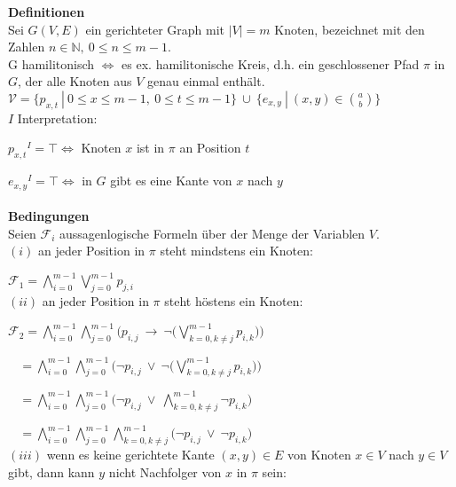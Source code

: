 \documentclass[11pt,a4paper,onecolumn,oneside]{scrartcl}
\begin{document}
\textbf{Definitionen} \\

Sei $G(V,E)$ ein gerichteter Graph mit $|V| = m$ Knoten, bezeichnet mit den Zahlen $n \in \mathbb{N},~0 \leq n \leq m-1$. \\


G hamilitonisch $\Leftrightarrow$ es ex. hamilitonische Kreis, d.h. ein geschlossener Pfad $\pi$ in $G$, der alle Knoten aus $V$ genau einmal enthält. \\

$\mathcal{V} = \{p_{x,t}~|~0 \leq x \leq m-1,~0 \leq t \leq m-1\}~\cup~\{e_{x,y}~|~(x,y) \in \binom{a}{b}\}$ \\

$I$ Interpretation:

${p_{x,t}}^I = \top \Leftrightarrow$ Knoten $x$ ist in $\pi$ an Position $t$

${e_{x,y}}^I = \top \Leftrightarrow$ in $G$ gibt es eine Kante von $x$ nach $y$ \\
\\

\textbf{Bedingungen} \\

Seien $\mathcal{F}_i$ aussagenlogische Formeln über der Menge der Variablen $V$.\\

$(i)$ an jeder Position in $\pi$ steht mindstens ein Knoten:

$\displaystyle\mathcal{F}_1 = \bigwedge_{i=0}^{m-1} \bigvee_{j=0}^{m-1} p_{j,i}$\\

$(ii)$ an jeder Position in $\pi$ steht höstens ein Knoten:

$\displaystyle\mathcal{F}_2 = \bigwedge_{i=0}^{m-1} \bigwedge_{j=0}^{m-1} \bigg(p_{i,j}~\to~\neg\Big(\bigvee_{k=0, k \ne j}^{m-1} p_{i,k}\Big)\bigg)$

$\displaystyle~~~~= \bigwedge_{i=0}^{m-1} \bigwedge_{j=0}^{m-1} \bigg(\neg p_{i,j}~\vee~\neg\Big(\bigvee_{k=0, k \ne j}^{m-1} p_{i,k}\Big)\bigg)$

$\displaystyle~~~~= \bigwedge_{i=0}^{m-1} \bigwedge_{j=0}^{m-1} \bigg(\neg p_{i,j}~\vee~\bigwedge_{k=0, k \ne j}^{m-1} \neg p_{i,k}\bigg)$

$\displaystyle~~~~= \bigwedge_{i=0}^{m-1} \bigwedge_{j=0}^{m-1} \bigwedge_{k=0, k \ne j}^{m-1} \Big(\neg p_{i,j}~\vee~\neg p_{i,k}\Big)$\\

$(iii)$ wenn es keine gerichtete Kante $(x,y) \in E$ von Knoten $x \in V$ nach $y \in V$ gibt, dann kann $y$ nicht Nachfolger von $x$ in $\pi$ sein:
\end{document}
